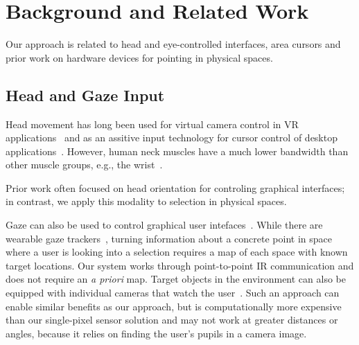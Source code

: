 \section{Background and Related Work}
Our approach is related to head and eye-controlled interfaces, area cursors and prior work on hardware devices for pointing in physical spaces.

\subsection{Head and Gaze Input}
Head movement has long been used for virtual camera control in VR applications~\cite{pausch_user_1993} and as an assitive input technology for cursor control of desktop applications~\cite{radwin1990method}. However, human neck muscles have a much lower bandwidth than other muscle groups, e.g., the wrist~\cite{card_morphological_1991}.


Prior work often focused on head orientation for controling graphical interfaces; in contrast, we apply this modality to selection in physical spaces.

Gaze can also be used to control graphical user intefaces~\cite{kumar2007eyepoint}. While there are wearable gaze trackers~\cite{bulling2009wearable}, turning information about a concrete point in space where a user is looking into a selection requires a map of each space with known target locations. Our system works through point-to-point IR communication and does not require an {\em a priori} map. Target objects in the environment can also be equipped with individual cameras that watch the user~\cite{smith2013gaze,vertegaal2005media}. Such an approach can enable similar benefits as our approach, but is computationally more expensive than our single-pixel sensor solution and may not work at greater distances or angles, because it relies on finding the user's pupils in a camera image.


